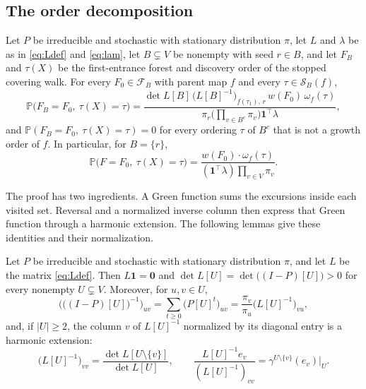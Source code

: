 \documentclass[onefignum,onetabnum,nohypdvips]{siamart250211}
\numberwithin{theorem}{section}
\numberwithin{equation}{section}
\newcommand{\Orders}{\mathcal{S}}
\newcommand{\Fset}{\mathcal{F}}
\newcommand{\pr}{\mathbb{P}}
\newcommand{\one}{\mathbf{1}}
\newcommand{\zero}{\mathbf{0}}
\begin{document}
\subsection{The order decomposition}\label{sec:orderlaw}


\begin{proposition}\label{prop:orderlaw}
Let $P$ be irreducible and stochastic with stationary distribution
$\pi$, let $L$ and $\lambda$ be as in \eqref{eq:Ldef} and
\eqref{eq:lam}, let $B\subsetneq V$ be nonempty with seed $r\in B$, and
let $F_B$ and $\tau(X)$ be the first-entrance forest and discovery
order of the stopped covering walk. For every $F_0\in\Fset_B$ with
parent map $f$ and every $\tau\in\Orders_B(f)$,
\begin{equation}\label{eq:orderlaw}
\pr\big(F_B=F_0,\ \tau(X)=\tau\big)
=\frac{\det L[B]\,\big(L[B]^{-1}\big)_{f(\tau_1),\,r}\,w(F_0)\,\omega_f(\tau)}
{\pi_r\big(\prod_{v\in B^c}\pi_v\big)\one^{\top}\lambda},
\end{equation}
and $\pr(F_B=F_0,\ \tau(X)=\tau)=0$ for every ordering $\tau$ of $B^c$
that is not a growth order of $f$. In particular, for $B=\{r\}$,
\begin{equation}\label{eq:orderlaw1}
\pr\big(F=F_0,\ \tau(X)=\tau\big)
=\frac{w(F_0)\cdot\omega_f(\tau)}{(\one^{\top}\lambda)\prod_{v\in V}\pi_v}.
\end{equation}
\end{proposition}

The proof has two ingredients. A Green function sums the excursions
inside each visited set. Reversal and a normalized inverse column
then express that Green function through a harmonic extension.
The following lemmas give these identities and their normalization.

\begin{lemma}\label{lem:admissible}
Let $P$ be irreducible and stochastic with stationary distribution
$\pi$, and let $L$ be the matrix \eqref{eq:Ldef}. Then $L\one=\zero$
and $\det L[U]=\det\big((I-P)[U]\big)>0$ for every nonempty
$U\subsetneq V$. Moreover, for $u,v\in U$,
\begin{equation}\label{eq:green}
\Big(\big((I-P)[U]\big)^{-1}\Big)_{uv}
=\sum_{t\ge0}\big(P[U]^t\big)_{uv}
=\frac{\pi_v}{\pi_u}\big(L[U]^{-1}\big)_{vu},
\end{equation}
and, if $|U|\ge2$, the column $v$ of $L[U]^{-1}$ normalized by its
diagonal entry is a harmonic extension:
\begin{equation}\label{eq:ratio}
\big(L[U]^{-1}\big)_{vv}=\frac{\det L[U\setminus\{v\}]}{\det L[U]},
\qquad
\frac{L[U]^{-1}e_v}{(L[U]^{-1})_{vv}}
=\gamma^{U\setminus\{v\}}(e_v)\big|_U .
\end{equation}
\end{lemma}
\end{document}
